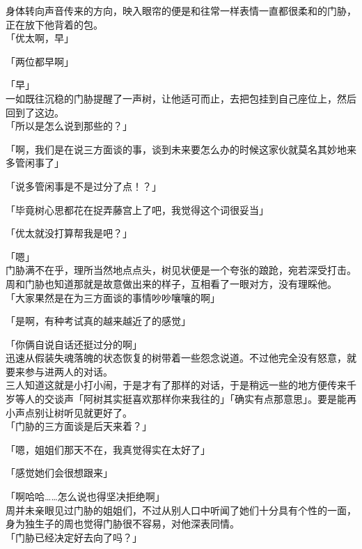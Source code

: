 身体转向声音传来的方向，映入眼帘的便是和往常一样表情一直都很柔和的门胁，正在放下他背着的包。\\

「优太啊，早」

「两位都早啊」

「早」\\

一如既往沉稳的门胁提醒了一声树，让他适可而止，去把包挂到自己座位上，然后回到了这边。\\

「所以是怎么说到那些的？」

「啊，我们是在说三方面谈的事，谈到未来要怎么办的时候这家伙就莫名其妙地来多管闲事了」

「说多管闲事是不是过分了点！？」

「毕竟树心思都花在捉弄藤宫上了吧，我觉得这个词很妥当」

「优太就没打算帮我是吧？」

「嗯」\\

门胁满不在乎，理所当然地点点头，树见状便是一个夸张的踉跄，宛若深受打击。周和门胁也知道那就是故意做出来的样子，互相看了一眼对方，没有理睬他。\\

「大家果然是在为三方面谈的事情吵吵嚷嚷的啊」

「是啊，有种考试真的越来越近了的感觉」

「你俩自说自话还挺过分的啊」\\

迅速从假装失魂落魄的状态恢复的树带着一些怨念说道。不过他完全没有怒意，就要来参与进两人的对话。\\

三人知道这就是小打小闹，于是才有了那样的对话，于是稍远一些的地方便传来千岁等人的交谈声「阿树其实挺喜欢那样你来我往的」「确实有点那意思」。要是能再小声点别让树听见就更好了。\\

「门胁的三方面谈是后天来着？」

「嗯，姐姐们那天不在，我真觉得实在太好了」

「感觉她们会很想跟来」

「啊哈哈……怎么说也得坚决拒绝啊」\\

周并未亲眼见过门胁的姐姐们，不过从别人口中听闻了她们十分具有个性的一面，身为独生子的周也觉得门胁很不容易，对他深表同情。\\

「门胁已经决定好去向了吗？」

